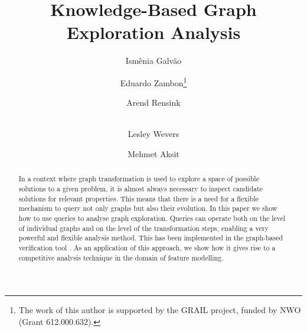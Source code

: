 
\title{Knowledge-Based Graph Exploration Analysis}%
%
\author{%
Ism\^enia Galv\~ao \and%
Eduardo Zambon\thanks{The work of this author is supported by the GRAIL
project, funded by NWO (Grant 612.000.632).} \and%
Arend Rensink \and\\%
Lesley Wevers \and%
Mehmet Aksit%
}%
%
%
%
\maketitle
%
\begin{abstract}
  In a context where graph transformation is used to explore a space of
  possible solutions to a given problem, it is almost always necessary to
  inspect candidate solutions for relevant properties. This means that there is
  a need for a flexible mechanism to query not only graphs but also their
  evolution.
%
  In this paper we show how to use \Prolog queries to analyse graph
  exploration. Queries can operate both on the level of individual graphs and
  on the level of the transformation steps, enabling a very powerful and
  flexible analysis method. This has been implemented in the graph-based
  verification tool \GROOVE.
%
  As an application of this approach, we show how it gives rise to a
  competitive analysis technique in the domain of feature modelling.
\end{abstract}
%
%

%
%